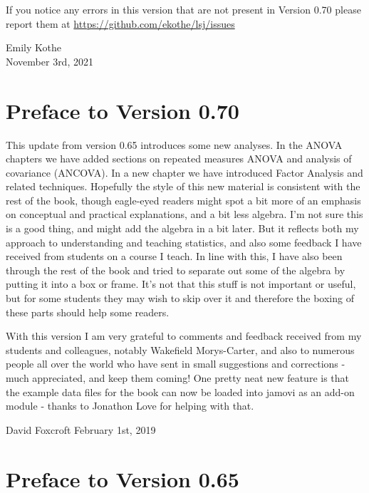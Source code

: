 \documentclass[
]{book}
\begin{document}
If you notice any errors in this version that are not present in Version 0.70 please report them at \url{https://github.com/ekothe/lsj/issues}

Emily Kothe\\
November 3rd, 2021

\hypertarget{preface-to-version-0.70}{%
\section*{Preface to Version 0.70}\label{preface-to-version-0.70}}

This update from version 0.65 introduces some new analyses. In the ANOVA chapters we have added sections on repeated measures ANOVA and analysis of covariance (ANCOVA). In a new chapter we have introduced Factor Analysis and related techniques. Hopefully the style of this new material is consistent with the rest of the book, though eagle-eyed readers might spot a bit more of an emphasis on conceptual and practical explanations, and a bit less algebra. I'm not sure this is a good thing, and might add the algebra in a bit later. But it reflects both my approach to understanding and teaching statistics, and also some feedback I have received from students on a course I teach. In line with this, I have also been through the rest of the book and tried to separate out some of the algebra by putting it into a box or frame. It's not that this stuff is not important or useful, but for some students they may wish to skip over it and therefore the boxing of these parts should help some readers.

With this version I am very grateful to comments and feedback received from my students and colleagues, notably Wakefield Morys-Carter, and also to numerous people all over the world who have sent in small suggestions and corrections - much appreciated, and keep them coming! One pretty neat new feature is that the example data files for the book can now be loaded into jamovi as an add-on module - thanks to Jonathon Love for helping with that.

David Foxcroft
February 1st, 2019

\hypertarget{preface-to-version-0.65}{%
\section*{Preface to Version 0.65}\label{preface-to-version-0.65}}
\end{document}
